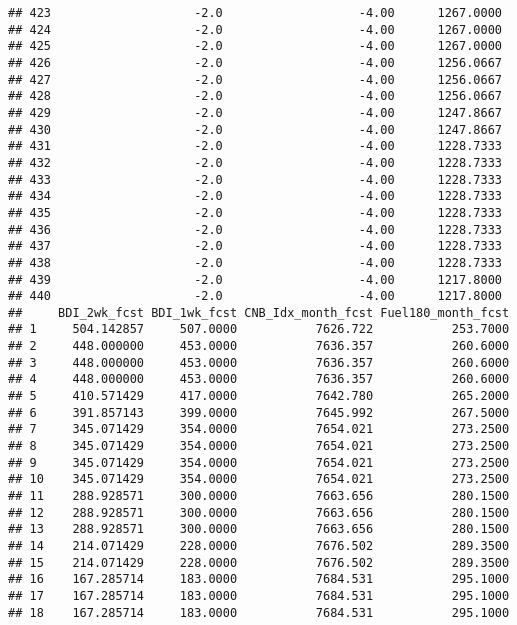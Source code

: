 \documentclass[]{article}
\begin{document}
\begin{verbatim}
## 423                    -2.0                   -4.00      1267.0000
## 424                    -2.0                   -4.00      1267.0000
## 425                    -2.0                   -4.00      1267.0000
## 426                    -2.0                   -4.00      1256.0667
## 427                    -2.0                   -4.00      1256.0667
## 428                    -2.0                   -4.00      1256.0667
## 429                    -2.0                   -4.00      1247.8667
## 430                    -2.0                   -4.00      1247.8667
## 431                    -2.0                   -4.00      1228.7333
## 432                    -2.0                   -4.00      1228.7333
## 433                    -2.0                   -4.00      1228.7333
## 434                    -2.0                   -4.00      1228.7333
## 435                    -2.0                   -4.00      1228.7333
## 436                    -2.0                   -4.00      1228.7333
## 437                    -2.0                   -4.00      1228.7333
## 438                    -2.0                   -4.00      1228.7333
## 439                    -2.0                   -4.00      1217.8000
## 440                    -2.0                   -4.00      1217.8000
##     BDI_2wk_fcst BDI_1wk_fcst CNB_Idx_month_fcst Fuel180_month_fcst
## 1     504.142857     507.0000           7626.722           253.7000
## 2     448.000000     453.0000           7636.357           260.6000
## 3     448.000000     453.0000           7636.357           260.6000
## 4     448.000000     453.0000           7636.357           260.6000
## 5     410.571429     417.0000           7642.780           265.2000
## 6     391.857143     399.0000           7645.992           267.5000
## 7     345.071429     354.0000           7654.021           273.2500
## 8     345.071429     354.0000           7654.021           273.2500
## 9     345.071429     354.0000           7654.021           273.2500
## 10    345.071429     354.0000           7654.021           273.2500
## 11    288.928571     300.0000           7663.656           280.1500
## 12    288.928571     300.0000           7663.656           280.1500
## 13    288.928571     300.0000           7663.656           280.1500
## 14    214.071429     228.0000           7676.502           289.3500
## 15    214.071429     228.0000           7676.502           289.3500
## 16    167.285714     183.0000           7684.531           295.1000
## 17    167.285714     183.0000           7684.531           295.1000
## 18    167.285714     183.0000           7684.531           295.1000

\end{verbatim}
\end{document}
